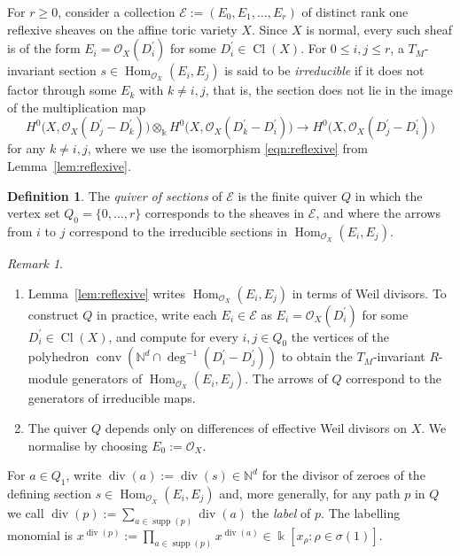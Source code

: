 \documentclass[11pt,a4paper]{amsart}
\numberwithin{equation}{section}
\theoremstyle{definition}
\newtheorem{definition}[theorem]{Definition}
\theoremstyle{remark}
\newtheorem{remark}[theorem]{Remark}
\newcommand{\kk}{\ensuremath{\Bbbk}}
\newcommand{\NN}{\ensuremath{\mathbb{N}}}
\newcommand{\conv}{\operatorname{conv}}
\renewcommand{\div}{\operatorname{div}}
\newcommand{\supp}{\operatorname{supp}}
\newcommand{\Cl}{\operatorname{Cl}}
\newcommand{\Hom}{\operatorname{Hom}}
\begin{document}
 For $r\geq 0$, consider a collection $\mathscr{E}:=(E_0,E_1,\dots,E_r)$ of distinct rank one reflexive sheaves on the affine toric variety $X$.  Since $X$ is normal, every such sheaf is of the form $E_i=\mathcal{O}_X(D_i^\prime)$ for some $D_i^\prime\in \Cl(X)$. For $0\leq i, j\leq r$, a $T_M$-invariant section $s \in \Hom_{\mathcal{O}_X}(E_i,E_j)$ is said to be \emph{irreducible} if it does not factor through some $E_k$ with $k\neq i,j$, that is, the section does not lie in the image of the multiplication map 
\[
H^0\big(X,\mathcal{O}_X(D_j^\prime-D_k^\prime)\big)\otimes_\kk H^0\big(X,\mathcal{O}_X(D_k^\prime-D_i^\prime)\big)\longrightarrow H^0\big(X,\mathcal{O}_X(D_j^\prime-D_i^\prime)\big)
\]
for any $k\neq i,j$, where we use the isomorphism \eqref{eqn:reflexive} from Lemma~\ref{lem:reflexive}.    
    
  \begin{definition}
  The \emph{quiver of sections} of $\mathscr{E}$ is the finite quiver $Q$ in which the vertex set $Q_0 = \{ 0, \dotsc,r \}$ corresponds to the sheaves in $\mathscr{E}$, and where the arrows from $i$ to $j$ correspond to the irreducible sections in $\Hom_{\mathcal{O}_X}(E_i,E_j)$.
\end{definition}

\begin{remark}
\begin{enumerate}
\item Lemma~\ref{lem:reflexive} writes $\Hom_{\mathcal{O}_X}(E_i,E_j)$ in terms of Weil divisors. To construct $Q$ in practice,  write each $E_i\in \mathscr{E}$ as $E_i=\mathcal{O}_X(D_i^\prime)$ for some $D_i^\prime\in \Cl(X)$, and compute for every $i,j\in Q_0$ the vertices of the polyhedron $\conv(\NN^d\cap \deg^{-1}(D^\prime_i-D_j^\prime))$ to obtain the $T_M$-invariant $R$-module generators of $\Hom_{\mathcal{O}_X}(E_i,E_j)$. The arrows of $Q$ correspond to the generators of irreducible maps.
\item The quiver $Q$ depends only on differences of effective Weil divisors on $X$. We normalise by choosing $E_0:= \mathcal{O}_X$.
\end{enumerate}
\end{remark}

For $a \in Q_1$, write $\div(a) := \div(s) \in \NN^{d}$ for the divisor of zeroes of the defining section $s \in \Hom_{\mathcal{O}_X}(E_i,E_j)$ and, more generally, for any path $p$ in $Q$ we call $\div(p) := \sum_{a\in \supp(p)} \div(a)$ the \emph{label} of $p$. The labelling monomial is $x^{\div(p)}:= \prod_{a\in \supp(p)} x^{\div(a)}\in \kk[x_\rho : \rho\in \sigma(1)]$.
     
\end{document}
